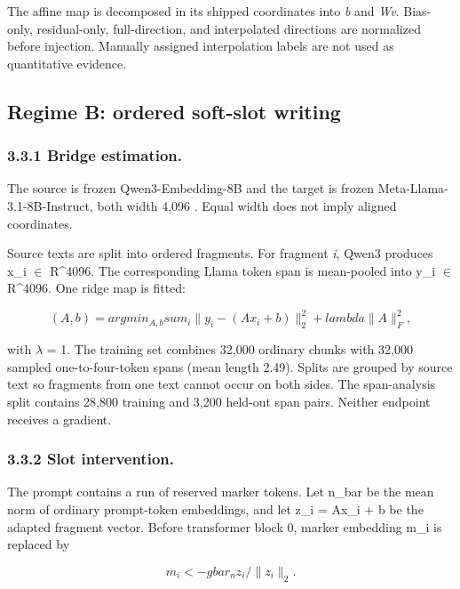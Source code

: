 \documentclass[11pt]{article}
\begin{document}
The affine map is decomposed in its shipped coordinates into \emph{b} and \emph{Wv}.
Bias-only, residual-only, full-direction, and interpolated directions are
normalized before injection. Manually assigned interpolation labels are not
used as quantitative evidence.

\subsection{Regime B: ordered soft-slot writing}


\subsubsection*{3.3.1 Bridge estimation.}


The source is frozen Qwen3-Embedding-8B and the target is frozen
Meta-Llama-3.1-8B-Instruct, both width 4,096
\citep{zhang2025qwen3embedding,grattafiori2024llama3}. Equal width does not imply
aligned coordinates.

Source texts are split into ordered fragments. For fragment \emph{i}, Qwen3
produces x\_i $\in$ R\textasciicircum{}4096. The corresponding Llama token span is mean-pooled into
y\_i $\in$ R\textasciicircum{}4096. One ridge map is fitted:

\begin{equation*}
(A,b) = argmin_{A,b} sum_i \|y_i - (Ax_i+b)\|_2^2
                         + lambda \|A\|_F^2 ,
\end{equation*}


with $\lambda$ = 1. The training set combines 32,000 ordinary chunks with
32,000 sampled one-to-four-token spans (mean length 2.49). Splits are grouped by
source text so fragments from one text cannot occur on both sides. The
span-analysis split contains 28,800 training and 3,200 held-out span pairs.
Neither endpoint receives a gradient.

\subsubsection*{3.3.2 Slot intervention.}


The prompt contains a run of reserved marker tokens. Let n\_bar be the mean norm
of ordinary prompt-token embeddings, and let z\_i = Ax\_i + b be the adapted
fragment vector. Before transformer block 0, marker embedding m\_i is replaced
by

\begin{equation*}
m_i <- g bar_n z_i / \|z_i\|_2 .
\end{equation*}
\end{document}
